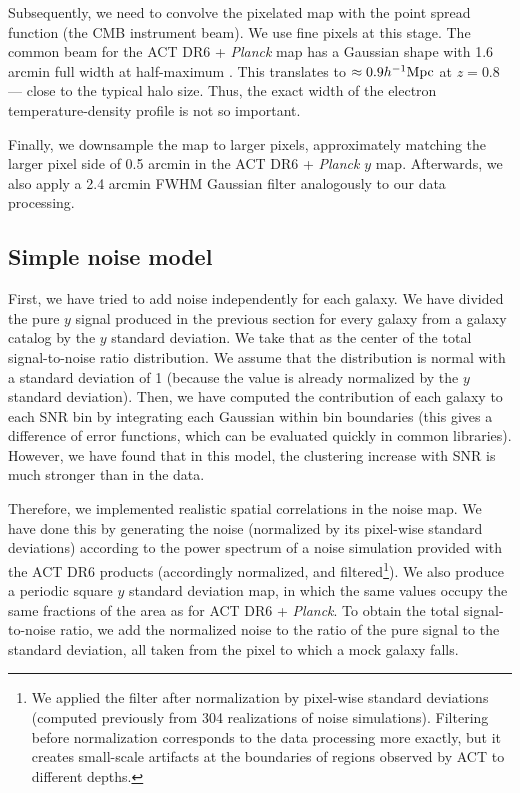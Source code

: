 Subsequently, we need to convolve the pixelated map with the point spread function (the CMB instrument beam).
We use fine pixels at this stage.
The common beam for the ACT DR6 + {\it Planck} map has a Gaussian shape with 1.6 arcmin full width at half-maximum \citep{ACT-maps-DR6}.
This translates to $\approx 0.9 h^{-1}{\rm Mpc}$ at $z=0.8$ --- close to the typical halo size.
Thus, the exact width of the electron temperature-density profile is not so important.

Finally, we downsample the map to larger pixels, approximately matching the larger pixel side of 0.5 arcmin in the ACT DR6 + {\it Planck} $y$ map.
Afterwards, we also apply a 2.4 arcmin FWHM Gaussian filter analogously to our data processing.

\subsection{Simple noise model}

First, we have tried to add noise independently for each galaxy.
We have divided the pure $y$ signal produced in the previous section for every galaxy from a galaxy catalog by the $y$ standard deviation.
We take that as the center of the total signal-to-noise ratio distribution.
We assume that the distribution is normal with a standard deviation of 1 (because the value is already normalized by the $y$ standard deviation).
Then, we have computed the contribution of each galaxy to each SNR bin by integrating each Gaussian within bin boundaries (this gives a difference of error functions, which can be evaluated quickly in common libraries).
However, we have found that in this model, the clustering increase with SNR is much stronger than in the data.

Therefore, we implemented realistic spatial correlations in the noise map.
We have done this by generating the noise (normalized by its pixel-wise standard deviations) according to the power spectrum of a noise simulation provided with the ACT DR6 products (accordingly normalized, and filtered\footnote{We applied the filter after normalization by pixel-wise standard deviations (computed previously from 304 realizations of noise simulations). Filtering before normalization corresponds to the data processing more exactly, but it creates small-scale artifacts at the boundaries of regions observed by ACT to different depths.}).
We also produce a periodic square $y$ standard deviation map, in which the same values occupy the same fractions of the area as for ACT DR6 + {\it Planck}.
To obtain the total signal-to-noise ratio, we add the normalized noise to the ratio of the pure signal to the standard deviation, all taken from the pixel to which a mock galaxy falls.

